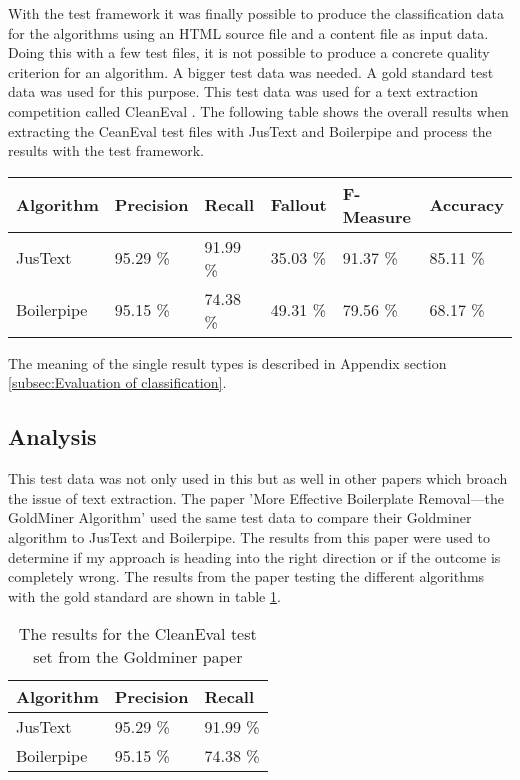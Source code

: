 With the test framework it was finally possible to produce the classification data for the  algorithms using an HTML source file and a content file as input data. Doing this with a few test files, it is not possible to produce a concrete quality criterion for an algorithm. A bigger test data was needed. A gold standard test data was used for this purpose. This test data was used for a text extraction competition called CleanEval \cite{CleanEval:online}. 
The following table shows the overall results when extracting the CeanEval test files with JusText and Boilerpipe and process the results with the test framework.


\begin{tabular}{| p{2.2cm} | p{2.2cm} | p{2.2cm} | p{2.2cm} | p{2.2cm} | p{2.2cm} |}
    \hline
    \textbf{Algorithm}      & \textbf{Precision}  & \textbf{Recall}  & \textbf{Fallout}  & \textbf{F-Measure}  &\textbf{Accuracy} \\ \hline
    JusText     & 95.29 \%       &  91.99 \%  & 35.03 \% & 91.37 \% & 85.11 \%   \\ \hline
    Boilerpipe & 95.15 \%       &  74.38 \%  & 49.31 \% & 79.56 \% &  68.17 \% \\ \hline

\end{tabular}

The meaning of the single result types is described in Appendix section \ref{subsec:Evaluation of classification}.



\subsection{Analysis}

This test data was not only used in this but as well in other papers which broach the issue of text extraction. The paper 'More Effective Boilerplate Removal—the GoldMiner Algorithm' \cite{paper:goldminer} used the same test data to compare their Goldminer algorithm to JusText and Boilerpipe. The results from this paper were used to determine if my approach is heading into the right direction or if the outcome is completely wrong. 
The results from the paper testing the different algorithms with the gold standard  are shown in table \ref{table:resultsGoldminer}.

\begin{table}[!ht]
\begin{tabular}{| p{3cm} | p{3cm} | p{3cm} | }
    \hline
    \textbf{Algorithm}      & \textbf{Precision}  & \textbf{Recall} 				\\ \hline
    JusText     & 95.29 \%       &  91.99 \%		\\ \hline
    Boilerpipe & 95.15 \%       &  74.38 \%		\\ \hline
\end{tabular}
\caption[asdfasdf]{The results for the CleanEval test set from the Goldminer paper}
\label{table:resultsGoldminer}
\end{table}

